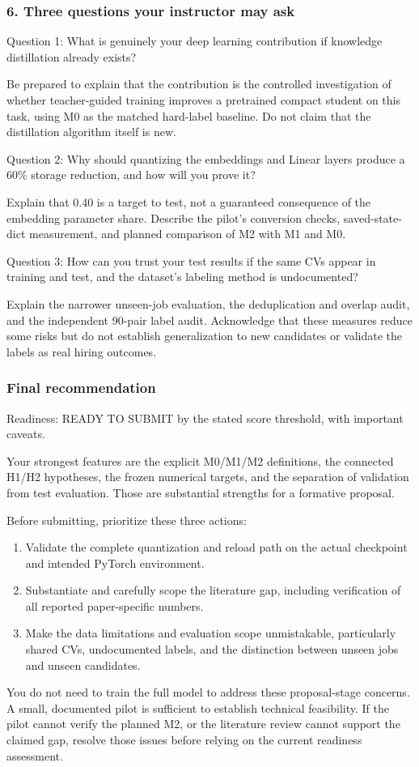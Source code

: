 \subsubsection*{6. Three questions your instructor may ask}
Question 1: What is genuinely your deep learning contribution if knowledge distillation already exists?

Be prepared to explain that the contribution is the controlled investigation of whether teacher-guided training improves a pretrained compact student on this task, using M0 as the matched hard-label baseline. Do not claim that the distillation algorithm itself is new.

Question 2: Why should quantizing the embeddings and Linear layers produce a 60\% storage reduction, and how will you prove it?

Explain that 0.40 is a target to test, not a guaranteed consequence of the embedding parameter share. Describe the pilot's conversion checks, saved-state-dict measurement, and planned comparison of M2 with M1 and M0.

Question 3: How can you trust your test results if the same CVs appear in training and test, and the dataset's labeling method is undocumented?

Explain the narrower unseen-job evaluation, the deduplication and overlap audit, and the independent 90-pair label audit. Acknowledge that these measures reduce some risks but do not establish generalization to new candidates or validate the labels as real hiring outcomes.

\subsubsection*{Final recommendation}
Readiness: READY TO SUBMIT by the stated score threshold, with important caveats.

Your strongest features are the explicit M0/M1/M2 definitions, the connected H1/H2 hypotheses, the frozen numerical targets, and the separation of validation from test evaluation. Those are substantial strengths for a formative proposal.

Before submitting, prioritize these three actions:

\begin{enumerate}
\item Validate the complete quantization and reload path on the actual checkpoint and intended PyTorch environment.
\item Substantiate and carefully scope the literature gap, including verification of all reported paper-specific numbers.
\item Make the data limitations and evaluation scope unmistakable, particularly shared CVs, undocumented labels, and the distinction between unseen jobs and unseen candidates.
\end{enumerate}
You do not need to train the full model to address these proposal-stage concerns. A small, documented pilot is sufficient to establish technical feasibility. If the pilot cannot verify the planned M2, or the literature review cannot support the claimed gap, resolve those issues before relying on the current readiness assessment.

